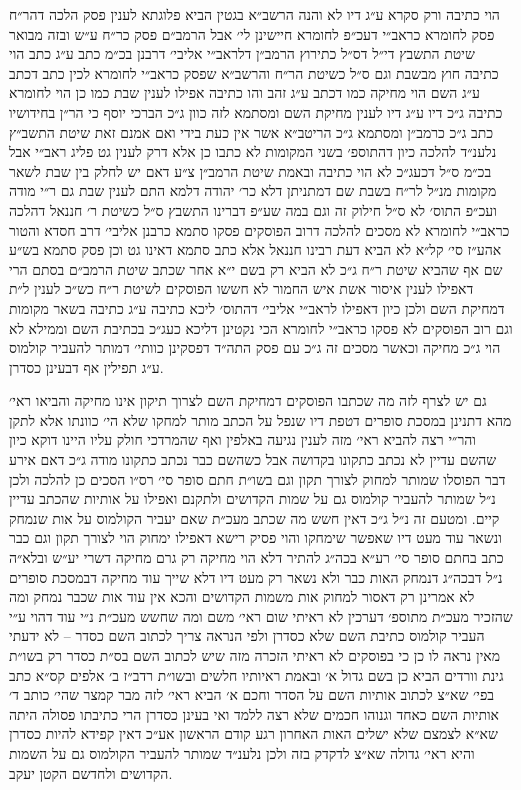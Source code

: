 \documentclass[12pt, openany]{book}
\begin{document}
\begin{multicols}{2}
הוי כתיבה ורק סקרא ע״ג דיו לא והנה הרשב״א בגטין הביא פלוגתא לענין פסק הלכה דהר״ח פסק לחומרא כראב״י דעכ״פ לחומרא חיישינן לי׳ אבל הרמב״ם פסק כר״ח ע״ש ובזה מבואר שיטת התשבץ די״ל דס״ל כתירוץ הרמב״ן דלראב״י אליבי׳ דרבנן בכ״מ כתב ע״ג כתב הוי כתיבה חוץ מבשבת וגם ס״ל כשיטת הר״ח והרשב״א שפסק כראב״י לחומרא לכין כתב דכתב ע״ג השם הוי מחיקה כמו דכתב ע״ג זהב והו כתיבה אפילו לענין שבת כמו כן הוי לחומרא כתיבה ג״כ דיו ע״ג דיו לענין מחיקת השם ומסתמא לזה כוון ג״כ הברכי יוסף כי הר״ן בחידושיו כתב ג״כ כרמב״ן ומסתמא ג״כ הריטב״א אשר אין כעת בידי ואם אמנם זאת שיטת התשב״ץ נלענ״ד להלכה כיון דהתוספ׳ בשני המקומות לא כתבו כן אלא דרק לענין גט פליג ראב״י אבל בכ״מ ס״ל דכעג״כ לא הוי כתיבה ובאמת שיטת הרמב״ן צ״ע דאם יש לחלק בין שבת לשאר מקומות מנ״ל לר״ח בשבת שם דמתניתן דלא כר׳ יהודה דלמא התם לענין שבת גם ר״י מודה ועכ״פ התוס׳ לא ס״ל חילוק זה וגם במה שע״פ דברינו התשבץ ס״ל כשיטת ר׳ חננאל דהלכה כראב״י לחומרא לא מסכים להלכה דרוב הפוסקים פסקו סתמא כרבנן אליבי׳ דרב חסדא והטור אהע״ז סי׳ קל״א לא הביא דעת רבינו חננאל אלא כתב סתמא דאינו גט וכן פסק סתמא בש״ע שם אף שהביא שיטת ר״ח ג״כ לא הביא רק בשם י״א אחר שכתב שיטת הרמב״ם בסתם הרי דאפילו לענין איסור אשת איש החמור לא חששו הפוסקים לשיטת ר״ח כש״כ לענין ל״ת דמחיקת השם ולכן כיון דאפילו לראב״י אליבי׳ דהתוס׳ ליכא כתיבה ע״ג כתיבה בשאר מקומות וגם רוב הפוסקים לא פסקו כראב״י לחומרא הכי נקטינן דליכא כעג״כ בכתיבת השם וממילא לא הוי ג״כ מחיקה וכאשר מסכים זה ג״כ עם פסק התה״ד דפסקינן כוותי׳ דמותר להעביר קולמוס ע״ג תפילין אף דבעינן כסדרן.\\\vspace{0pt}

גם יש לצרף לזה מה שכתבו הפוסקים דמחיקת השם לצרוך תיקון אינו מחיקה והביאו ראי׳ מהא דתנינן במסכת סופרים דטפת דיו שנפל על הכתב מותר למחקו שלא הי׳ כוונתו אלא לתקן והר״י רצה להביא ראי׳ מזה לענין נגיעה באלפין ואף שהמרדכי חולק עליו היינו דוקא כיון שהשם עדיין לא נכתב כתקונו בקדושה אבל כשהשם כבר נכתב כתקונו מודה ג״כ דאם אירע דבר הפוסלו שמותר למחוק לצורך תקון וגם בשו״ת חתם סופר סי׳ רס״ו הסכים כן להלכה ולכן נ״ל שמותר להעביר קולמוס גם על שמות הקדושים ולתקנם ואפילו על אותיות שהכתב עדיין קיים. ומטעם זה נ״ל ג״כ דאין חשש מה שכתב מעכ״ת שאם יעביר הקולמוס על אות שנמחק ונשאר עוד מעט דיו שאפשר שימחקו והוי פסיק רישא דאפילו ימחוק הוי לצורך תקון וגם כבר כתב בחתם סופר סי׳ רע״א בכה״ג להתיר דלא הוי מחיקה רק גרם מחיקה דשרי יע״ש ובלא״ה נ״ל דבכה״ג דנמחק האות כבר ולא נשאר רק מעט דיו דלא שייך עוד מחיקה דבמסכת סופרים לא אמרינן רק דאסור למחוק אות משמות הקדושים והכא אין עוד אות שכבר נמחק ומה שהזכיר מעכ״ת מתוספ׳ דערכין לא ראיתי שום ראי׳ משם ומה שחשש מעכ״ת נ״י עוד דהוי ע״י העביר קולמוס כתיבת השם שלא כסדרן ולפי הנראה צריך לכתוב השם כסדר – לא ידעתי מאין נראה לו כן כי בפוסקים לא ראיתי הזכרה מזה שיש לכתוב השם בס״ת כסדר רק בשו״ת גינת וורדים הביא כן בשם גדול א׳ ובאמת ראיותיו חלשים ובשו״ת רדב״ז ב׳ אלפים קס״א כתב בפי׳ שא״צ לכתוב אותיות השם על הסדר וחכם א׳ הביא ראי׳ לזה מבר קמצר שהי׳ כותב ד׳ אותיות השם כאחד וגנוהו חכמים שלא רצה ללמד ואי בעינן כסדרן הרי כתיבתו פסולה היתה שא״א לצמצם שלא ישלים האות האחרון רגע קודם הראשון אע״כ דאין קפידא להיות כסדרן והיא ראי׳ גדולה שא״צ לדקדק בזה ולכן נלענ״ד שמותר להעביר הקולמוס גם על השמות הקדושים ולחדשם הקטן יעקב.\\\vspace{0pt}

\end{multicols}\newpage
\end{document}
